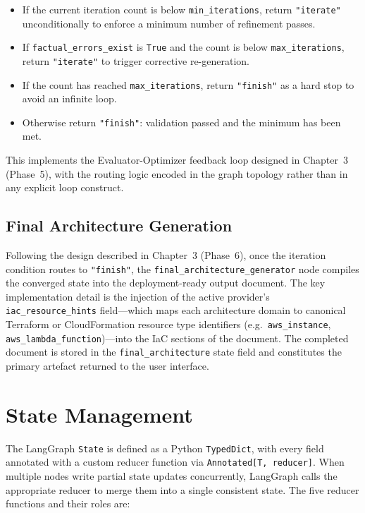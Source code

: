 \begin{itemize}
    \item If the current iteration count is below \texttt{min\_iterations}, return \texttt{"iterate"} unconditionally to enforce a minimum number of refinement passes.
    \item If \texttt{factual\_errors\_exist} is \texttt{True} and the count is below \texttt{max\_iterations}, return \texttt{"iterate"} to trigger corrective re-generation.
    \item If the count has reached \texttt{max\_iterations}, return \texttt{"finish"} as a hard stop to avoid an infinite loop.
    \item Otherwise return \texttt{"finish"}: validation passed and the minimum has been met.
\end{itemize}

This implements the Evaluator-Optimizer feedback loop designed in Chapter~3 (Phase~5), with the routing logic encoded in the graph topology rather than in any explicit loop construct.

\subsection{Final Architecture Generation}

Following the design described in Chapter~3 (Phase~6), once the iteration condition routes to \texttt{"finish"}, the \texttt{final\_architecture\_generator} node compiles the converged state into the deployment-ready output document. The key implementation detail is the injection of the active provider's \texttt{iac\_resource\_hints} field---which maps each architecture domain to canonical Terraform or CloudFormation resource type identifiers (e.g.\ \texttt{aws\_instance}, \texttt{aws\_lambda\_function})---into the IaC sections of the document. The completed document is stored in the \texttt{final\_architecture} state field and constitutes the primary artefact returned to the user interface.

\section{State Management}
\label{sec:state_management}

The LangGraph \texttt{State} is defined as a Python \texttt{TypedDict}, with every field annotated with a custom reducer function via \texttt{Annotated[T, reducer]}. When multiple nodes write partial state updates concurrently, LangGraph calls the appropriate reducer to merge them into a single consistent state. The five reducer functions and their roles are:

